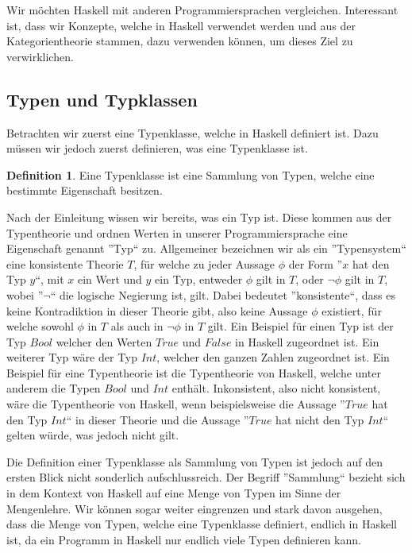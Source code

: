 \documentclass{hhuarticle}
\theoremstyle{definition}
\newtheorem{definition}{Definition}[section]
\theoremstyle{theorem}
\begin{document}
  Wir möchten Haskell mit anderen Programmiersprachen vergleichen.
  Interessant ist, dass wir Konzepte, welche in Haskell verwendet werden
  und aus der Kategorientheorie stammen, dazu verwenden können, um dieses
  Ziel zu verwirklichen.

  \subsection{Typen und Typklassen}

  Betrachten wir zuerst eine Typenklasse, welche in Haskell definiert ist.
  Dazu müssen wir jedoch zuerst definieren, was eine Typenklasse ist.

  \begin{definition}
    Eine Typenklasse ist eine Sammlung von Typen, welche eine bestimmte
    Eigenschaft besitzen.
  \end{definition}

  Nach der Einleitung wissen wir bereits, was ein Typ ist. Diese kommen
  aus der Typentheorie und ordnen Werten in unserer Programmiersprache
  eine Eigenschaft genannt ''Typ`` zu. Allgemeiner bezeichnen wir als
  ein ''Typensystem`` eine konsistente Theorie $T$, für welche zu jeder Aussage $\phi$
  der Form ''$x$ hat den Typ $y$``, mit $x$ ein Wert und $y$ ein Typ,
  entweder $\phi$ gilt in $T$, oder $\neg \phi$ gilt in $T$, wobei ''$\neg$``
  die logische Negierung ist, gilt. Dabei bedeutet ''konsistente``, dass
  es keine Kontradiktion in dieser Theorie gibt, also keine Aussage $\phi$
  existiert, für welche sowohl $\phi$ in $T$ als auch in $\neg \phi$ in $T$ gilt.
  Ein Beispiel für einen Typ ist der Typ $Bool$ welcher
  den Werten $True$ und $False$ in Haskell zugeordnet ist. Ein weiterer Typ wäre
  der Typ $Int$, welcher den ganzen Zahlen zugeordnet ist.
  Ein Beispiel für eine Typentheorie ist die Typentheorie von Haskell,
  welche unter anderem die Typen $Bool$ und $Int$ enthält. Inkonsistent,
  also nicht konsistent, wäre die Typentheorie von Haskell, wenn
  beispielsweise die Aussage ''$True$ hat den Typ $Int$`` in dieser Theorie
  und die Aussage ''$True$ hat nicht den Typ $Int$`` gelten würde, was
  jedoch nicht gilt.

  Die Definition einer Typenklasse als Sammlung von Typen ist jedoch auf
  den ersten Blick nicht sonderlich aufschlussreich. Der Begriff ''Sammlung``
  bezieht sich in dem Kontext von Haskell auf eine Menge von Typen im
  Sinne der Mengenlehre. Wir können sogar weiter eingrenzen und stark davon
  ausgehen, dass die Menge von Typen, welche eine Typenklasse definiert,
  endlich in Haskell ist, da ein Programm in Haskell nur endlich viele
  Typen definieren kann.
\end{document}
